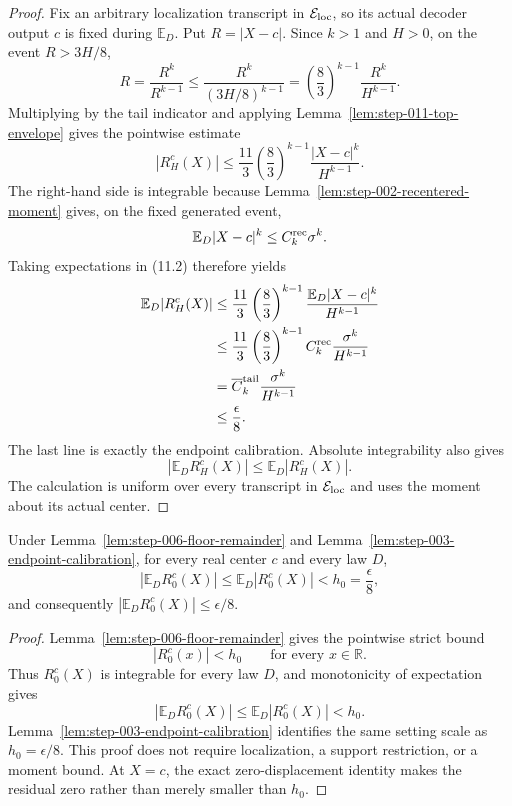 \begin{proof}
Fix an arbitrary localization transcript in
\(\mathcal E_{\rm loc}\), so its actual decoder output \(c\) is fixed during
\(\mathbb E_D\). Put \(R=|X-c|\). Since \(k>1\) and \(H>0\), on the event
\(R>3H/8\),
\[
R
=\frac{R^k}{R^{k-1}}
\leq\frac{R^k}{(3H/8)^{k-1}}
=\left(\frac83\right)^{k-1}\frac{R^k}{H^{k-1}}.
\]
Multiplying by the tail indicator and applying
Lemma~\ref{lem:step-011-top-envelope} gives the pointwise estimate
\[
|R_H^c(X)|
\leq\frac{11}{3}\left(\frac83\right)^{k-1}
\frac{|X-c|^k}{H^{k-1}}.
\tag{11.2}
\]
The right-hand side is integrable because Lemma~\ref{lem:step-002-recentered-moment} gives, on the fixed generated
event,
\[
\mathbb E_D|X-c|^k\leq C_k^{\rm rec}\sigma^k.
\]
Taking expectations in (11.2) therefore yields
\[
\begin{aligned}
\mathbb E_D|R_H^c(X)|
&\leq\frac{11}{3}\left(\frac83\right)^{k-1}
  \frac{\mathbb E_D|X-c|^k}{H^{k-1}}\\
&\leq\frac{11}{3}\left(\frac83\right)^{k-1}
  C_k^{\rm rec}\frac{\sigma^k}{H^{k-1}}\\
&=\overline C_k^{\rm tail}\frac{\sigma^k}{H^{k-1}}\\
&\leq\frac\epsilon8.
\end{aligned}
\]
The last line is exactly the endpoint calibration. Absolute integrability also
gives
\[
|\mathbb E_D R_H^c(X)|\leq\mathbb E_D|R_H^c(X)|.
\]
The calculation is
uniform over every transcript in \(\mathcal E_{\rm loc}\) and uses the
moment about its actual center.
\end{proof}

\begin{lemma}\label{lem:step-011-bottom-bias}
Under Lemma~\ref{lem:step-006-floor-remainder} and
Lemma~\ref{lem:step-003-endpoint-calibration}, for every real center
\(c\) and every law \(D\),
\[
\left|\mathbb E_D R_0^c(X)\right|
\leq\mathbb E_D|R_0^c(X)|
<h_0=\frac\epsilon8,
\]
and consequently
\(\left|\mathbb E_D R_0^c(X)\right|\leq\epsilon/8\).
\end{lemma}

\begin{proof}
Lemma~\ref{lem:step-006-floor-remainder} gives the pointwise strict bound
\[
|R_0^c(x)|<h_0
\qquad\text{for every }x\in\mathbb R.
\]
Thus \(R_0^c(X)\) is integrable for every law \(D\), and monotonicity of
expectation gives
\[
|\mathbb E_D R_0^c(X)|
\leq\mathbb E_D|R_0^c(X)|<h_0.
\]
Lemma~\ref{lem:step-003-endpoint-calibration} identifies the
same setting scale as \(h_0=\epsilon/8\). This proof does not require
localization, a support restriction, or a moment bound. At \(X=c\), the
exact zero-displacement identity makes the residual zero rather than
merely smaller than \(h_0\).
\end{proof}


